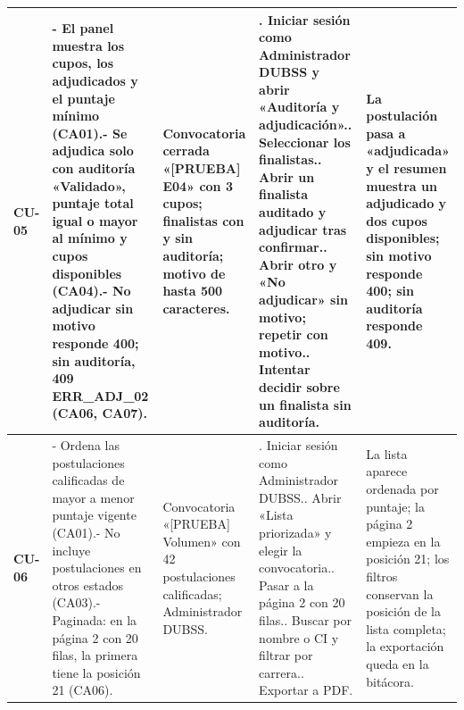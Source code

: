 {\begin{longtable}{@{}>{\raggedright\arraybackslash}p{1.2cm}>{\raggedright\arraybackslash}p{3.7cm}>{\raggedright\arraybackslash}p{3.0cm}>{\raggedright\arraybackslash}p{4.4cm}>{\raggedright\arraybackslash}p{3.4cm}@{}}
\textbf{CU-05} & - El panel muestra los cupos, los adjudicados y el puntaje mínimo (CA01).\newline - Se adjudica solo con auditoría «Validado», puntaje total igual o mayor al mínimo y cupos disponibles (CA04).\newline - No adjudicar sin motivo responde 400; sin auditoría, 409 ERR\_ADJ\_02 (CA06, CA07). & Convocatoria cerrada «[PRUEBA] E04» con 3 cupos; finalistas con y sin auditoría; motivo de hasta 500 caracteres. & 1. Iniciar sesión como Administrador DUBSS y abrir «Auditoría y adjudicación».\newline 2. Seleccionar los finalistas.\newline 3. Abrir un finalista auditado y adjudicar tras confirmar.\newline 4. Abrir otro y «No adjudicar» sin motivo; repetir con motivo.\newline 5. Intentar decidir sobre un finalista sin auditoría. & La postulación pasa a «adjudicada» y el resumen muestra un adjudicado y dos cupos disponibles; sin motivo responde 400; sin auditoría responde 409. \\
\midrule
\textbf{CU-06} & - Ordena las postulaciones calificadas de mayor a menor puntaje vigente (CA01).\newline - No incluye postulaciones en otros estados (CA03).\newline - Paginada: en la página 2 con 20 filas, la primera tiene la posición 21 (CA06). & Convocatoria «[PRUEBA] Volumen» con 42 postulaciones calificadas; Administrador DUBSS. & 1. Iniciar sesión como Administrador DUBSS.\newline 2. Abrir «Lista priorizada» y elegir la convocatoria.\newline 3. Pasar a la página 2 con 20 filas.\newline 4. Buscar por nombre o CI y filtrar por carrera.\newline 5. Exportar a PDF. & La lista aparece ordenada por puntaje; la página 2 empieza en la posición 21; los filtros conservan la posición de la lista completa; la exportación queda en la bitácora. \\
\midrule

\end{longtable}}
